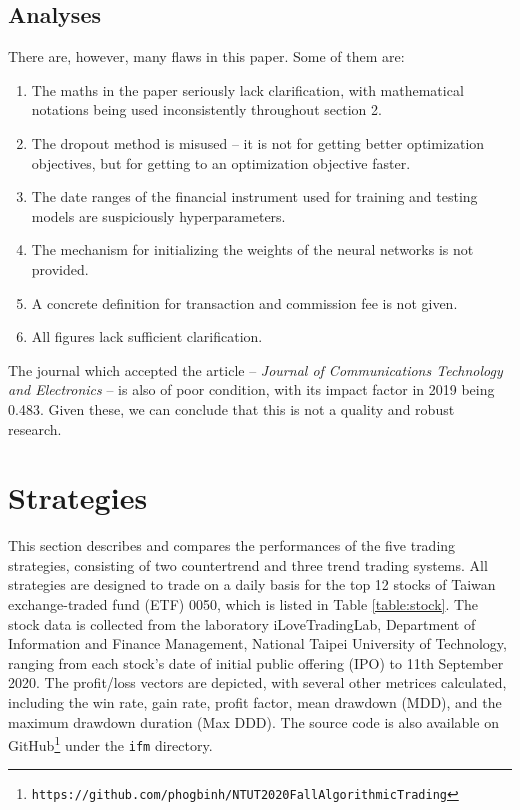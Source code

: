 \documentclass[12pt, letterpaper, oneside]{article}
\begin{document}
\subsection{Analyses}
There are, however, many flaws in this paper. Some of them are:
\begin{enumerate}
    \item The maths in the paper seriously lack clarification, with mathematical notations being used inconsistently throughout section 2.
    \item The dropout method is misused -- it is not for getting better optimization objectives, but for getting to an optimization objective faster.
    \item The date ranges of the financial instrument used for training and testing models are suspiciously hyperparameters.
    \item The mechanism for initializing the weights of the neural networks is not provided.
    \item A concrete definition for transaction and commission fee is not given.
    \item All figures lack sufficient clarification.
\end{enumerate}
The journal which accepted the article -- \textit{Journal of Communications Technology and Electronics} -- is also of poor condition, with its impact factor in 2019 being 0.483\cite{comtech}. Given these, we can conclude that this is not a quality and robust research.

\section{Strategies}
This section describes and compares the performances of the five trading strategies, consisting of two countertrend and three trend trading systems. All strategies are designed to trade on a daily basis for the top 12 stocks of Taiwan exchange-traded fund (ETF) 0050, which is listed in Table \ref{table:stock}. The stock data is collected from the laboratory iLoveTradingLab, Department of Information and Finance Management, National Taipei University of Technology, ranging from each stock's date of initial public offering (IPO) to 11th September 2020. The profit/loss vectors are depicted, with several other metrices calculated, including the win rate, gain rate, profit factor, mean drawdown (MDD), and the maximum drawdown duration (Max DDD). The source code is also available on GitHub\footnote{\texttt{https://github.com/phogbinh/NTUT2020FallAlgorithmicTrading}} under the \texttt{ifm} directory.
\end{document}

